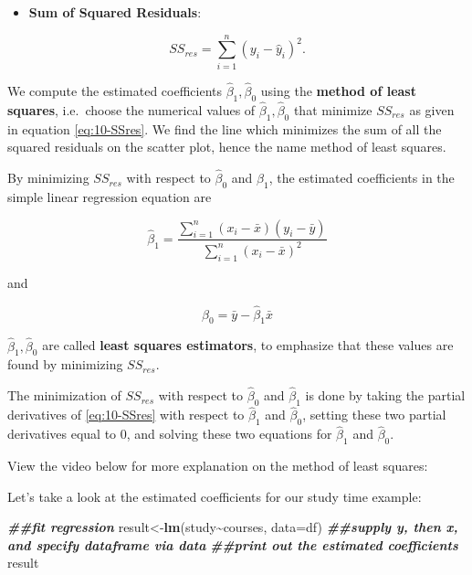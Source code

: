 \documentclass[
]{book}
\newenvironment{Shaded}{\begin{snugshade}}{\end{snugshade}}
\newcommand{\AttributeTok}[1]{\textcolor[rgb]{0.13,0.29,0.53}{#1}}
\newcommand{\DocumentationTok}[1]{\textcolor[rgb]{0.56,0.35,0.01}{\textbf{\textit{#1}}}}
\newcommand{\FunctionTok}[1]{\textcolor[rgb]{0.13,0.29,0.53}{\textbf{#1}}}
\newcommand{\NormalTok}[1]{#1}
\newcommand{\OtherTok}[1]{\textcolor[rgb]{0.56,0.35,0.01}{#1}}
\newcommand{\SpecialCharTok}[1]{\textcolor[rgb]{0.81,0.36,0.00}{\textbf{#1}}}
\providecommand{\tightlist}{%
  \setlength{\itemsep}{0pt}\setlength{\parskip}{0pt}}
\begin{document}
\begin{itemize}
\tightlist
\item
  \textbf{Sum of Squared Residuals}:
\end{itemize}

\begin{equation} 
SS_{res} =  \sum\limits_{i=1}^n(y_i-\hat{y}_i)^2.
\label{eq:10-SSres}
\end{equation}

We compute the estimated coefficients \(\hat{\beta}_1,\hat{\beta}_0\) using the \textbf{method of least squares}, i.e.~choose the numerical values of \(\hat{\beta}_1,\hat{\beta}_0\) that minimize \(SS_{res}\) as given in equation \eqref{eq:10-SSres}. We find the line which minimizes the sum of all the squared residuals on the scatter plot, hence the name method of least squares.

By minimizing \(SS_{res}\) with respect to \(\hat{\beta}_0\) and \(\hat{\beta}_1\), the estimated coefficients in the simple linear regression equation are

\begin{equation} 
\hat{\beta}_1 = \frac{\sum\limits_{i=1}^n(x_i-\bar{x})(y_i-\bar{y})}{\sum\limits_{i=1}^n(x_i-\bar{x})^2}
\label{eq:10-b1}
\end{equation}

and

\begin{equation} 
\hat{\beta}_0 = \bar{y}- \hat{\beta}_1 \bar{x}
\label{eq:10-b0}
\end{equation}

\(\hat{\beta}_1, \hat{\beta}_0\) are called \textbf{least squares estimators}, to emphasize that these values are found by minimizing \(SS_{res}\).

The minimization of \(SS_{res}\) with respect to \(\hat{\beta}_0\) and \(\hat{\beta}_1\) is done by taking the partial derivatives of \eqref{eq:10-SSres} with respect to \(\hat{\beta}_1\) and \(\hat{\beta}_0\), setting these two partial derivatives equal to 0, and solving these two equations for \(\hat{\beta}_1\) and \(\hat{\beta}_0\).

View the video below for more explanation on the method of least squares:

Let's take a look at the estimated coefficients for our study time example:

\begin{Shaded}
\begin{Highlighting}[]
\DocumentationTok{\#\#fit regression}
\NormalTok{result}\OtherTok{\textless{}{-}}\FunctionTok{lm}\NormalTok{(study}\SpecialCharTok{\textasciitilde{}}\NormalTok{courses, }\AttributeTok{data=}\NormalTok{df) }\DocumentationTok{\#\#supply y, then x, and specify dataframe via data}
\DocumentationTok{\#\#print out the estimated coefficients}
\NormalTok{result}
\end{Highlighting}
\end{Shaded}
\end{document}
